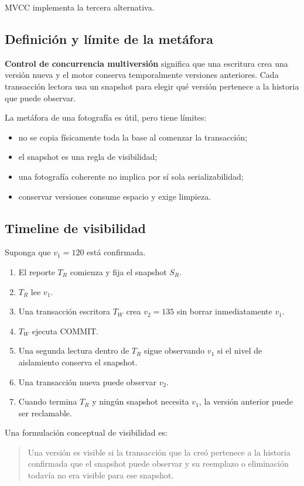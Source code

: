 \documentclass[variant=apuntes,cover=institutional,mode=screen]{ua-engineering-v6-article}
\begin{document}
MVCC implementa la tercera alternativa.

\subsection{Definición y límite de la metáfora}

\textbf{Control de concurrencia multiversión} significa que una escritura crea una versión nueva y el motor conserva temporalmente versiones anteriores. Cada transacción lectora usa un snapshot para elegir qué versión pertenece a la historia que puede observar.

La metáfora de una fotografía es útil, pero tiene límites:

\begin{itemize}
\item no se copia físicamente toda la base al comenzar la transacción;
\item el snapshot es una regla de visibilidad;
\item una fotografía coherente no implica por sí sola serializabilidad;
\item conservar versiones consume espacio y exige limpieza.
\end{itemize}

\subsection{Timeline de visibilidad}

Suponga que $v_1=120$ está confirmada.

\begin{enumerate}
\item El reporte $T_R$ comienza y fija el snapshot $S_R$.
\item $T_R$ lee $v_1$.
\item Una transacción escritora $T_W$ crea $v_2=135$ sin borrar inmediatamente $v_1$.
\item $T_W$ ejecuta COMMIT.
\item Una segunda lectura dentro de $T_R$ sigue observando $v_1$ si el nivel de aislamiento conserva el snapshot.
\item Una transacción nueva puede observar $v_2$.
\item Cuando termina $T_R$ y ningún snapshot necesita $v_1$, la versión anterior puede ser reclamable.
\end{enumerate}

Una formulación conceptual de visibilidad es:

\begin{quote}
Una versión es visible si la transacción que la creó pertenece a la historia confirmada que el snapshot puede observar y su reemplazo o eliminación todavía no era visible para ese snapshot.
\end{quote}
\end{document}
